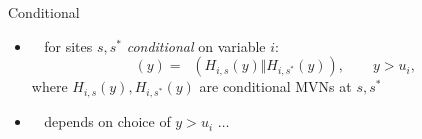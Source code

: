 \documentclass[14pt,aspectratio=169]{beamer}
\newcommand{\JSGa}{\mathop{\mathrm{JS}^{\mathrm{G}_{\lambda}}}\nolimits}
\newcommand{\cJSGa}[1]{\mathop{\mathrm{cJS}_{i, #1}^{\mathrm{G}_{\lambda}}}\nolimits}
\newcommand{\eJSGa}[1]{\mathop{\mathrm{eJS}_{i, #1}^{\mathrm{G}_{\lambda}}}\nolimits}
\begin{document}

\begin{frame}{Conditional $\JSGa{}$}
  \begin{itemize}
    \item <1-> $\JSGa{}$ for sites $s, s^*$ \emph{conditional} on variable $i$:
      \[
        \cJSGa{s, s^*}(y) = \JSGa{}\left(H_{i, s}(y) \Vert H_{i, s^*}(y)\right),\qquad y > u_i,
      \]
      where $H_{i, s}(y), H_{i, s^*}(y)$ are conditional $\mathrm{MVN}$s at $s, s^*$
    \item <2-> $\cJSGa{}$ depends on choice of $y > u_i$ $\ldots$
    \end{itemize}
\end{frame}
\end{document}

